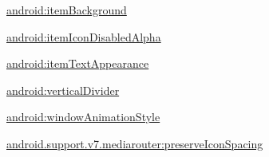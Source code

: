 {\ttfamily \hyperlink{classandroid_1_1support_1_1v7_1_1mediarouter_1_1R_1_1styleable_a12e27d06c79c07df1c4f4294540a5dd6}{android\+:item\+Background}}

{\ttfamily \hyperlink{classandroid_1_1support_1_1v7_1_1mediarouter_1_1R_1_1styleable_a2db0c55a5ea64d6e4e520e5461ab2486}{android\+:item\+Icon\+Disabled\+Alpha}}

{\ttfamily \hyperlink{classandroid_1_1support_1_1v7_1_1mediarouter_1_1R_1_1styleable_a20e8a09f6069c46231defb4f911cb006}{android\+:item\+Text\+Appearance}}

{\ttfamily \hyperlink{classandroid_1_1support_1_1v7_1_1mediarouter_1_1R_1_1styleable_a547babce2fcf74d1db985fc93e6781e5}{android\+:vertical\+Divider}}

{\ttfamily \hyperlink{classandroid_1_1support_1_1v7_1_1mediarouter_1_1R_1_1styleable_ac9fd0f82d65057d958023557551b7306}{android\+:window\+Animation\+Style}}

{\ttfamily \hyperlink{classandroid_1_1support_1_1v7_1_1mediarouter_1_1R_1_1styleable_ae65c88e6a427903c40bab472037f77a2}{android.\+support.\+v7.\+mediarouter\+:preserve\+Icon\+Spacing}}

